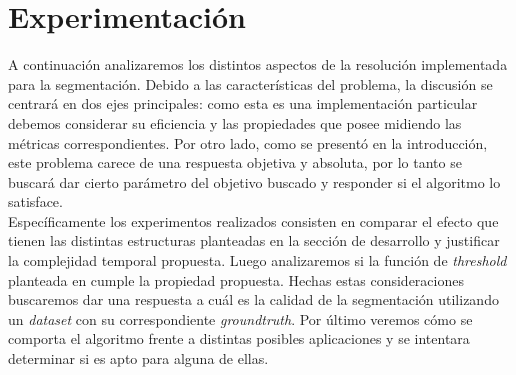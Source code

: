 \section{Experimentación}
A continuaci\'on analizaremos los distintos aspectos de la resoluci\'on implementada para la segmentaci\'on. Debido a las características del problema, la discusi\'on se centrar\'a en dos ejes principales: como esta es una implementaci\'on particular debemos considerar su eficiencia y las propiedades que posee midiendo las métricas correspondientes. Por otro lado, como se present\'o en la introducci\'on, este problema carece de una respuesta objetiva y absoluta, por lo tanto se buscar\'a dar cierto parámetro del objetivo buscado y responder si el algoritmo lo satisface. \\
\indent Específicamente los experimentos realizados consisten en comparar el efecto que tienen las distintas estructuras planteadas en la secci\'on de desarrollo y justificar la complejidad temporal propuesta. Luego analizaremos si la funci\'on de \textit{threshold} planteada en \cite{Felzenszwalb2004} cumple la propiedad propuesta. Hechas estas consideraciones buscaremos dar una respuesta a cu\'al es la calidad de la segmentaci\'on utilizando un \textit{dataset} con su correspondiente \textit{groundtruth}. Por último veremos c\'omo se comporta el algoritmo frente a distintas posibles aplicaciones y se intentara determinar si es apto para alguna de ellas.      


